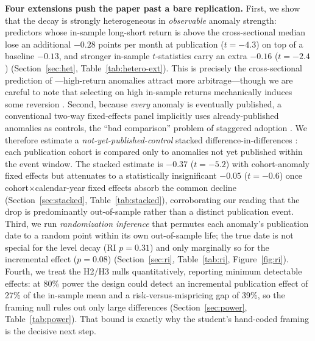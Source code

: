\documentclass[12pt]{article}
\begin{document}
\textbf{Four extensions push the paper past a bare replication.} First, we show that the decay
is strongly heterogeneous in \emph{observable} anomaly strength: predictors whose in-sample
long-short return is above the cross-sectional median lose an additional $-0.28$ points per
month at publication ($t=-4.3$) on top of a baseline $-0.13$, and stronger in-sample
$t$-statistics carry an extra $-0.16$ ($t=-2.4$) (Section~\ref{sec:het},
Table~\ref{tab:hetero-ext}). This is precisely the cross-sectional prediction of
\citet{mcleanpontiff2016}---high-return anomalies attract more arbitrage---though we are careful
to note that selecting on high in-sample returns mechanically induces some reversion
\citep{harveyliuzhu2016}. Second, because \emph{every} anomaly is eventually published, a
conventional two-way fixed-effects panel implicitly uses already-published anomalies as
controls, the ``bad comparison'' problem of staggered adoption
\citep{goodmanbacon2021,callaway2021}. We therefore estimate a \emph{not-yet-published-control}
stacked difference-in-differences \citep{cengiz2019}: each publication cohort is compared only
to anomalies not yet published within the event window. The stacked estimate is $-0.37$
($t=-5.2$) with cohort-anomaly fixed effects but attenuates to a statistically insignificant
$-0.05$ ($t=-0.6$) once cohort$\times$calendar-year fixed effects absorb the common decline
(Section~\ref{sec:stacked}, Table~\ref{tab:stacked}), corroborating our reading that the drop is
predominantly out-of-sample rather than a distinct publication event. Third, we run
\emph{randomization inference} \citep{young2019} that permutes each anomaly's publication date
to a random point within its own out-of-sample life; the true date is not special for the level
decay (RI $p=0.31$) and only marginally so for the incremental effect ($p=0.08$)
(Section~\ref{sec:ri}, Table~\ref{tab:ri}, Figure~\ref{fig:ri}). Fourth, we treat the H2/H3
nulls quantitatively, reporting minimum detectable effects: at 80\% power the design could
detect an incremental publication effect of 27\% of the in-sample mean and a
risk-versus-mispricing gap of 39\%, so the framing null rules out only large differences
(Section~\ref{sec:power}, Table~\ref{tab:power}). That bound is exactly why the student's
hand-coded framing is the decisive next step.
\end{document}
